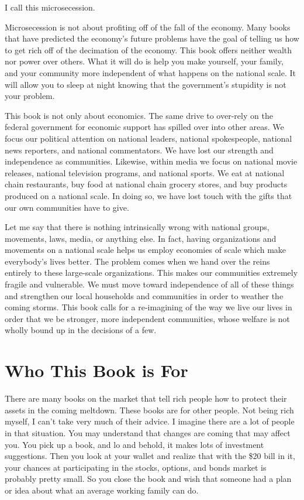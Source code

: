 {\color{black}
I call this microsecession.}

{\color{black}
Microsecession is not about profiting off of the fall of the economy.
Many books that have predicted the economy’s future problems have the
goal of telling us how to get rich off of the decimation of the
economy. This book
offers neither wealth
nor power over others. What it will do is help you make
yourself, your
family, and your community more independent of what happens on the
national scale. It will allow you to sleep at night knowing that
the government’s
stupidity is not your problem.}

{\color{black}
This book is not only about economics. The same drive to over-rely on
the federal government for economic support has spilled over into other
areas. We focus our political attention on national leaders, national
spokespeople, national news reporters, and national commentators. We
have lost our strength and independence as communities. Likewise,
within media we focus on national movie releases, national television
programs, and national sports. We eat at national chain restaurants,
buy food at national chain grocery stores, and buy products produced on
a national scale. In doing so, we have lost touch with the gifts that
our own communities have to give. }

{\color{black}
Let me say that there is nothing intrinsically wrong with national
groups, movements, laws, media, or anything else. In fact, having
organizations and movements on a national scale helps us employ
economies of scale which make everybody’s lives better. The problem
comes when we hand over the reins entirely to these large-scale
organizations. This makes our communities extremely fragile and
vulnerable. We must move toward independence of all of these things and
strengthen our local households and communities in order to weather the
coming storms. This book calls for a re-imagining of the way we live
our lives in order that we be stronger, more independent communities,
whose welfare is not wholly bound up in the decisions of a few.}

\section{Who This Book is For}
{\color{black}
There are many books on the market that tell rich people how to protect
their assets in the coming meltdown. These books are for other people.
Not being rich
myself, I can’t take
very much of their advice. I imagine there are a lot of people in that
situation. You may understand that changes are coming that may affect
you. You pick up a book, and lo and behold, it makes lots of investment
suggestions. Then you look at your wallet and realize that with the
\$20 bill in it, your chances at participating in the stocks, options,
and bonds market is probably pretty small. So you close the book and
wish that someone had a plan or idea about what an average working
family can do.}

